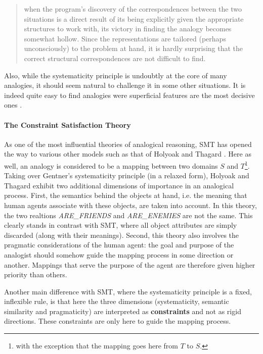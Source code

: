 \begin{quote}
  when the program’s discovery of the correspondences between the two situations
  is a direct result of its being explicitly given the appropriate structures
  to work with, its victory in finding the analogy becomes somewhat hollow.
  Since the representations are tailored (perhaps unconsciously) to the problem
  at hand, it is hardly surprising that the correct structural correspondences
  are not difficult to find.
\end{quote}

Also, while the systematicity principle is undoubtly at the core of many
analogies, it should seem natural to challenge it in some other situations. It
is indeed quite easy to find analogies were superficial features are the most
decisive ones \cite{Bar10}.

\paragraph{The Constraint Satisfaction Theory\\}

As one of the most influential theories of analogical reasoning, SMT has opened
the way to various other models such as that of Holyoak and Thagard
\cite{HolTha89}. Here as well, an analogy is considered to be a mapping between
two domains $S$ and $T$\footnote{with the exception that the mapping goes here
from $T$ to $S$.}. Taking over Gentner's systematicity principle (in a relaxed
form), Holyoak and Thagard exhibit two additional dimensions of importance in
an analogical process. First, the semantics behind the objects at hand, i.e.
the meaning that human agents associate with these objects, are taken into
account. In this theory, the two realtions \textit{ARE\_FRIENDS} and
\textit{ARE\_ENEMIES} are not the same. This clearly stands in contrast with
SMT, where all object attributes are simply discarded (along with their
meanings). Second, this theory also involves
the pragmatic considerations of the human agent: the goal and purpose of the
analogist should somehow guide the mapping process in some direction or
another. Mappings that serve the purpose of the agent are therefore given
higher priority than others.

Another main difference with SMT, where the systematicity principle is a fixed,
inflexible rule, is that here the three dimensions (systematicity, semantic
similarity and pragmaticity) are interpreted as \textbf{constraints} and not as
rigid directions. These constraints are only here to guide the mapping process.

